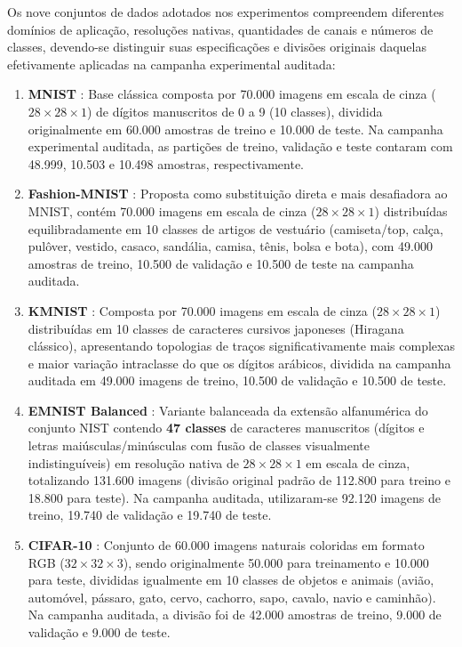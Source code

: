 \documentclass[
    12pt,
    openright,
    oneside,
    a4paper,
    english,
    brazil
]{abntex2}
\begin{document}
Os nove conjuntos de dados adotados nos experimentos compreendem diferentes domínios de aplicação, resoluções nativas, quantidades de canais e números de classes, devendo-se distinguir suas especificações e divisões originais daquelas efetivamente aplicadas na campanha experimental auditada:

\begin{enumerate}
    \item \textbf{MNIST} \cite{lecun1998gradient}: Base clássica composta por 70.000 imagens em escala de cinza (\(28 \times 28 \times 1\)) de dígitos manuscritos de 0 a 9 (10 classes), dividida originalmente em 60.000 amostras de treino e 10.000 de teste. Na campanha experimental auditada, as partições de treino, validação e teste contaram com 48.999, 10.503 e 10.498 amostras, respectivamente.
    \item \textbf{Fashion-MNIST} \cite{xiao2017fashionmnist}: Proposta como substituição direta e mais desafiadora ao MNIST, contém 70.000 imagens em escala de cinza (\(28 \times 28 \times 1\)) distribuídas equilibradamente em 10 classes de artigos de vestuário (camiseta/top, calça, pulôver, vestido, casaco, sandália, camisa, tênis, bolsa e bota), com 49.000 amostras de treino, 10.500 de validação e 10.500 de teste na campanha auditada.
    \item \textbf{KMNIST} \cite{clanuwat2018kmnist}: Composta por 70.000 imagens em escala de cinza (\(28 \times 28 \times 1\)) distribuídas em 10 classes de caracteres cursivos japoneses (Hiragana clássico), apresentando topologias de traços significativamente mais complexas e maior variação intraclasse do que os dígitos arábicos, dividida na campanha auditada em 49.000 imagens de treino, 10.500 de validação e 10.500 de teste.
    \item \textbf{EMNIST Balanced} \cite{cohen2017emnist}: Variante balanceada da extensão alfanumérica do conjunto NIST contendo \textbf{47 classes} de caracteres manuscritos (dígitos e letras maiúsculas/minúsculas com fusão de classes visualmente indistinguíveis) em resolução nativa de \(28 \times 28 \times 1\) em escala de cinza, totalizando 131.600 imagens (divisão original padrão de 112.800 para treino e 18.800 para teste). Na campanha auditada, utilizaram-se 92.120 imagens de treino, 19.740 de validação e 19.740 de teste.
    \item \textbf{CIFAR-10} \cite{krizhevsky2009learning}: Conjunto de 60.000 imagens naturais coloridas em formato RGB (\(32 \times 32 \times 3\)), sendo originalmente 50.000 para treinamento e 10.000 para teste, divididas igualmente em 10 classes de objetos e animais (avião, automóvel, pássaro, gato, cervo, cachorro, sapo, cavalo, navio e caminhão). Na campanha auditada, a divisão foi de 42.000 amostras de treino, 9.000 de validação e 9.000 de teste.

\end{enumerate}
\end{document}
